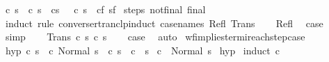 \begin{isabellebody}
\ {\isachardoublequoteopen}{\isasymexists}c{\isacharprime}\ s{\isacharprime}{\isachardot}\ {\isasymGamma}{\isasymturnstile}\ {\isacharparenleft}c{\isacharcomma}\ s{\isacharparenright}\ {\isasymrightarrow}\ {\isacharparenleft}c{\isacharprime}{\isacharcomma}s{\isacharprime}{\isacharparenright}\ {\isasymand}\ {\isasymGamma}{\isasymturnstile}\ {\isacharparenleft}c{\isacharprime}{\isacharcomma}\ s{\isacharprime}{\isacharparenright}\ {\isasymrightarrow}\isactrlsup {\isacharasterisk}\ {\isacharparenleft}c\isactrlsub f{\isacharcomma}\ s\isactrlsub f{\isacharparenright}{\isachardoublequoteclose}\isanewline
%
\isadelimproof
%
\endisadelimproof
%
\isatagproof
{}\isamarkupfalse%
\ steps\ not{\isacharunderscore}final\ final\isanewline
{}\isamarkupfalse%
\ {\isacharparenleft}induct\ rule{\isacharcolon}\ converse{\isacharunderscore}rtranclp{\isacharunderscore}induct{}\ {\isacharbrackleft}case{\isacharunderscore}names\ Refl\ Trans{\isacharbrackright}{\isacharparenright}\isanewline
\ \ \isamarkupfalse%
\ Refl\ \isamarkupfalse%
\ {\isacharquery}case\ \isamarkupfalse%
\ simp\isanewline
{}\isamarkupfalse%
\isanewline
\ \ \isamarkupfalse%
\ {\isacharparenleft}Trans\ c\ s\ c{\isacharprime}\ s{\isacharprime}{\isacharparenright}\isanewline
\ \ \isamarkupfalse%
\ {\isacharquery}case\ \isamarkupfalse%
\ auto\isanewline
{}\isamarkupfalse%
%
\endisatagproof
{\isafoldproof}%
%
\isadelimproof
\isanewline
%
\endisadelimproof
\isanewline
{}\isamarkupfalse%
\ wf{\isacharunderscore}implies{\isacharunderscore}termi{\isacharunderscore}reach{\isacharunderscore}step{\isacharunderscore}case{\isacharcolon}\isanewline
{}\ hyp{\isacharcolon}\ {\isachardoublequoteopen}{\isasymAnd}c{\isacharprime}\ s{\isacharprime}{\isachardot}\ {\isasymGamma}{\isasymturnstile}\ {\isacharparenleft}c{\isacharcomma}\ Normal\ s{\isacharparenright}\ {\isasymrightarrow}\ {\isacharparenleft}c{\isacharprime}{\isacharcomma}\ s{\isacharprime}{\isacharparenright}\ {\isasymLongrightarrow}\ {\isasymGamma}{\isasymturnstile}c{\isacharprime}\ {\isasymdown}\ s{\isacharprime}{\isachardoublequoteclose}\isanewline
{}\ {\isachardoublequoteopen}{\isasymGamma}{\isasymturnstile}c\ {\isasymdown}\ Normal\ s{\isachardoublequoteclose}\isanewline
%
\isadelimproof
%
\endisadelimproof
%
\isatagproof
{}\isamarkupfalse%
\ hyp\isanewline
{}\isamarkupfalse%
\ {\isacharparenleft}induct\ c{\isacharparenright}\isanewline

\end{isabellebody}
